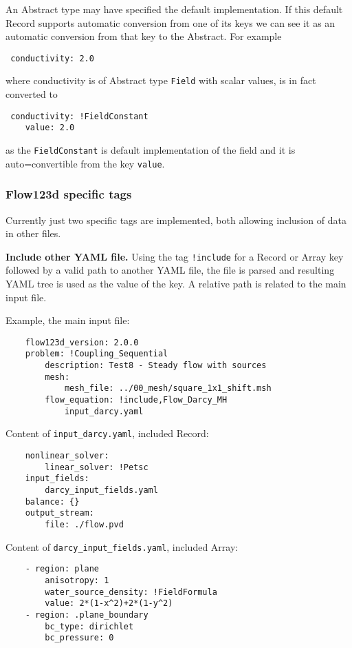 An Abstract type may have specified the default implementation. If this default Record supports automatic conversion from one of its keys
we can see it as an automatic conversion from that key to the Abstract. For example
\begin{verbatim}
 conductivity: 2.0
\end{verbatim}
where conductivity is of Abstract type \verb'Field' with scalar values, is in fact converted to
\begin{verbatim}
 conductivity: !FieldConstant
    value: 2.0
\end{verbatim}
as the \verb'FieldConstant' is default implementation of the field and it is auto=convertible from the key \verb'value'. 

\subsubsection{Flow123d specific tags}
\label{sec:spec_tags}
Currently just two specific tags are implemented, both allowing inclusion of data in other files.

{\bf Include other YAML file.}
Using the tag \verb'!include' for a Record or Array key followed by a valid path to another YAML file,
the file is parsed and resulting YAML tree is used as the value of the key. A relative path is related to the main input file.

Example, the main input file:
\begin{verbatim}
    flow123d_version: 2.0.0
    problem: !Coupling_Sequential
        description: Test8 - Steady flow with sources
        mesh:
            mesh_file: ../00_mesh/square_1x1_shift.msh
        flow_equation: !include,Flow_Darcy_MH
            input_darcy.yaml
\end{verbatim}
Content of \verb'input_darcy.yaml', included Record:
\begin{verbatim}
    nonlinear_solver:
        linear_solver: !Petsc
    input_fields:
        darcy_input_fields.yaml
    balance: {}
    output_stream: 
        file: ./flow.pvd
\end{verbatim}
Content of \verb'darcy_input_fields.yaml', included Array:
\begin{verbatim}
    - region: plane
        anisotropy: 1
        water_source_density: !FieldFormula
        value: 2*(1-x^2)+2*(1-y^2)
    - region: .plane_boundary
        bc_type: dirichlet
        bc_pressure: 0    
\end{verbatim}

